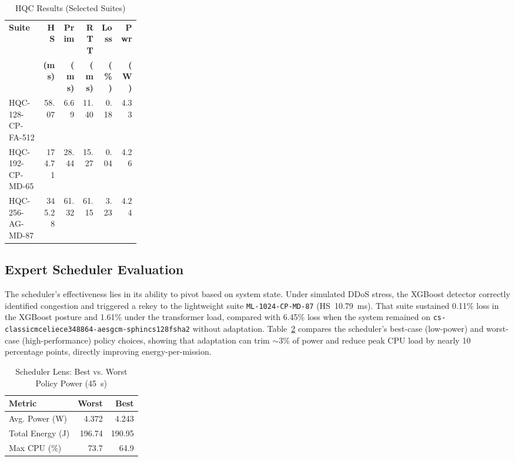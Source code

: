\documentclass[sigconf,natbib=false]{acmart}
\begin{document}
\begin{table}[ht]
\centering
\caption{HQC Results (Selected Suites)}
\label{tab:hqc_results}
\begingroup
\footnotesize
\setlength{\tabcolsep}{2pt}
\begin{tabular}{@{}p{0.26\linewidth}rrrrr@{}}
\toprule
\textbf{Suite} & \textbf{HS} & \textbf{Prim} & \textbf{RTT} & \textbf{Loss} & \textbf{Pwr} \\
 & \textbf{(ms)} & \textbf{(ms)} & \textbf{(ms)} & \textbf{(\%)} & \textbf{(W)} \\
\midrule
HQC-128-CP-FA-512 & 58.07 & 6.69 & 11.40 & 0.18 & 4.33 \\
HQC-192-CP-MD-65 & 174.71 & 28.44 & 15.27 & 0.04 & 4.26 \\
HQC-256-AG-MD-87 & 345.28 & 61.32 & 61.15 & 3.23 & 4.24 \\
\bottomrule
\end{tabular}
\endgroup
\end{table}

\subsection{Expert Scheduler Evaluation}

The scheduler's effectiveness lies in its ability to pivot based on system state. Under simulated DDoS stress, the XGBoost detector correctly identified congestion and triggered a rekey to the lightweight suite \texttt{ML-1024-CP-MD-87} (HS~10.79~ms). That suite sustained 0.11\% loss in the XGBoost posture and 1.61\% under the transformer load, compared with 6.45\% loss when the system remained on \texttt{cs-classicmceliece348864-aesgcm-sphincs128fsha2} without adaptation. Table~\ref{tab:policy_power} compares the scheduler's best-case (low-power) and worst-case (high-performance) policy choices, showing that adaptation can trim $\sim$3\% of power and reduce peak CPU load by nearly 10 percentage points, directly improving energy-per-mission.

\begin{table}[ht]
\centering
\caption{Scheduler Lens: Best vs. Worst Policy Power (45~s)}
\label{tab:policy_power}
\begingroup
\small
\setlength{\tabcolsep}{4pt}
\begin{tabular}{@{}lrr@{}}
\toprule
\textbf{Metric} & \textbf{Worst} & \textbf{Best} \\
\midrule
Avg. Power (W) & 4.372 & 4.243 \\
Total Energy (J) & 196.74 & 190.95 \\
Max CPU (\%) & 73.7 & 64.9 \\
\bottomrule
\end{tabular}
\endgroup
\end{table}
\end{document}
